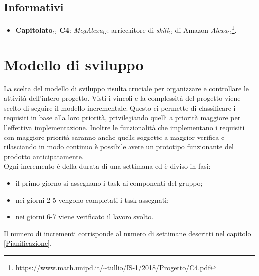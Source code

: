 \subsection{Informativi}
\begin{itemize}
	\item \textbf{Capitolato$_{G}$  C4}: \textit{MegAlexa$_{G}$}: arricchitore di \textit{skill$_{G}$} di Amazon \textit{Alexa$_{G}$}\footnote{\url{https://www.math.unipd.it/~tullio/IS-1/2018/Progetto/C4.pdf}}.
\end{itemize}
\section{Modello  di sviluppo}
\label{Modello di sviluppo}
La scelta del modello di sviluppo risulta cruciale per organizzare e controllare le attività dell'intero progetto. Visti i vincoli e la complessità del progetto viene scelto di seguire il modello incrementale. Questo ci permette di classificare i requisiti in base alla loro priorità, privilegiando quelli a priorità maggiore per l'effettiva implementazione. Inoltre le funzionalità che implementano i requisiti con maggiore priorità saranno anche quelle soggette a maggior verifica e rilasciando in modo continuo è possibile avere un prototipo funzionante del prodotto anticipatamente. \\
Ogni incremento è della durata di una settimana ed è diviso in fasi:
\begin{itemize}
	\item il primo giorno si assegnano i task ai componenti del gruppo;
	\item nei giorni 2-5 vengono completati i task assegnati;
	\item nei giorni 6-7 viene verificato il lavoro svolto.
\end{itemize}
Il numero di incrementi corrisponde al numero di settimane descritti nel capitolo \ref{Pianificazione}.
